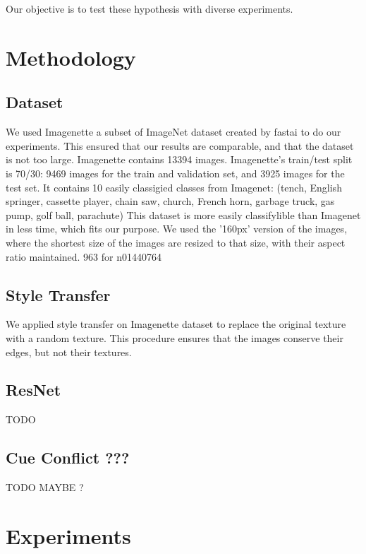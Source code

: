 \documentclass{article}
\begin{document}
Our objective is to test these hypothesis with diverse experiments.

\section{Methodology}

\subsection{Dataset}

We used Imagenette \cite{fastai2019} a subset of ImageNet dataset created 
by fastai to do our experiments.
This ensured that our results are comparable, and that the dataset is not too large.
Imagenette contains 13394 images.
Imagenette's train/test split is 70/30: 9469 images for the train and validation set, and 3925 images for the test set.
It contains 10 easily classigied classes from Imagenet: 
(tench, English springer, cassette player, chain saw, church, French horn, garbage truck, gas pump, golf ball, parachute)
This dataset is more easily classifylible than Imagenet in less time, which fits our purpose.
We used the '160px' version of the images, where the shortest size of the images are resized to that size, 
with their aspect ratio maintained.
963 for n01440764


\subsection{Style Transfer}

We applied style transfer on Imagenette dataset to replace the original texture 
with a random texture. This procedure ensures that the images conserve their edges,
but not their textures.


\subsection{ResNet}

TODO


\subsection{Cue Conflict ???}

TODO MAYBE ?

\newpage
\section{Experiments}
\end{document}
